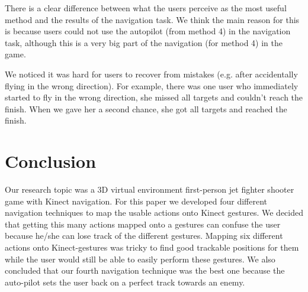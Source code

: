 \documentclass{acm_proc_article-sp}
\begin{document}
There is a clear difference between what the users perceive as the most useful method and the results of the navigation task. We think the main reason for this is because users could not use the autopilot (from method 4) in the navigation task, although this is a very big part of the navigation (for method 4) in the game.

We noticed it was hard for users to recover from mistakes (e.g. after accidentally flying in the wrong direction). For example, there was one user who immediately started to fly in the wrong direction, she missed all targets and couldn't reach the finish. When we gave her a second chance, she got all targets and reached the finish.



\section{Conclusion}
Our research topic was a 3D virtual environment first-person jet fighter shooter game with Kinect navigation.
For this paper we developed four different navigation techniques to map the usable actions onto Kinect gestures. We decided that getting this many actions mapped onto a gestures can confuse the user because he/she can lose track of the different gestures. Mapping six different actions onto Kinect-gestures was tricky to find good trackable positions for them while the user would still be able to easily perform these gestures.
We also concluded that our fourth navigation technique was the best one because the auto-pilot sets the user back on a perfect track towards an enemy.

%
\nocite{*}


%
%

\balancecolumns
\end{document}
